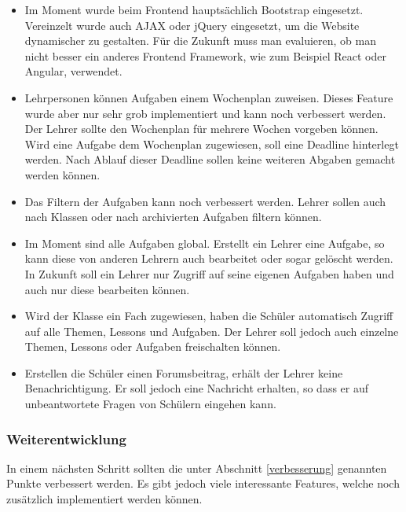 \begin{itemize}
	\item Im Moment wurde beim Frontend hauptsächlich Bootstrap eingesetzt. Vereinzelt wurde auch AJAX oder jQuery eingesetzt, um die Website dynamischer zu gestalten. Für die Zukunft muss man evaluieren, ob man nicht besser ein anderes Frontend Framework, wie zum Beispiel React oder Angular, verwendet.
	\item Lehrpersonen können Aufgaben einem Wochenplan zuweisen. Dieses Feature wurde aber nur sehr grob implementiert und kann noch verbessert werden. Der Lehrer sollte den Wochenplan für mehrere Wochen vorgeben können. Wird eine Aufgabe dem Wochenplan zugewiesen, soll eine Deadline hinterlegt werden. Nach Ablauf dieser Deadline sollen keine weiteren Abgaben gemacht werden können.
	\item Das Filtern der Aufgaben kann noch verbessert werden. Lehrer sollen auch nach Klassen oder nach archivierten Aufgaben filtern können.
	\item Im Moment sind alle Aufgaben global. Erstellt ein Lehrer eine Aufgabe, so kann diese von anderen Lehrern auch bearbeitet oder sogar gelöscht werden. In Zukunft soll ein Lehrer nur Zugriff auf seine eigenen Aufgaben haben und auch nur diese bearbeiten können.
	\item Wird der Klasse ein Fach zugewiesen, haben die Schüler automatisch Zugriff auf alle Themen, Lessons und Aufgaben. Der Lehrer soll jedoch auch einzelne Themen, Lessons oder Aufgaben freischalten können.
	\item Erstellen die Schüler einen Forumsbeitrag, erhält der Lehrer keine Benachrichtigung. Er soll jedoch eine Nachricht erhalten, so dass er auf unbeantwortete Fragen von Schülern eingehen kann.
\end{itemize}


\subsubsection{Weiterentwicklung}
In einem nächsten Schritt sollten die unter Abschnitt \ref{verbesserung} genannten Punkte verbessert werden. Es gibt jedoch viele interessante Features, welche noch zusätzlich implementiert werden können.

